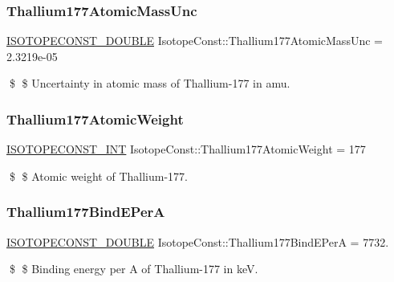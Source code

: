 \subsubsection{\texorpdfstring{Thallium177\+Atomic\+Mass\+Unc}{Thallium177AtomicMassUnc}}
{\footnotesize\ttfamily \mbox{\hyperlink{group___isotope_const-_macros_ga8f45a7272ce02c0b4c65c44636ed719a}{I\+S\+O\+T\+O\+P\+E\+C\+O\+N\+S\+T\+\_\+\+D\+O\+U\+B\+LE}} Isotope\+Const\+::\+Thallium177\+Atomic\+Mass\+Unc = 2.\+3219e-\/05}

\$ \$ Uncertainty in atomic mass of Thallium-\/177 in amu. \mbox{\label{group___isotope_const-_thallium-_tl177_ga06bbaae2fe662b8d554f86f44a942c0a}} 
\subsubsection{\texorpdfstring{Thallium177\+Atomic\+Weight}{Thallium177AtomicWeight}}
{\footnotesize\ttfamily \mbox{\hyperlink{group___isotope_const-_macros_ga5f18360b3e99483a35c32d789e62621c}{I\+S\+O\+T\+O\+P\+E\+C\+O\+N\+S\+T\+\_\+\+I\+NT}} Isotope\+Const\+::\+Thallium177\+Atomic\+Weight = 177}

\$ \$ Atomic weight of Thallium-\/177. \mbox{\label{group___isotope_const-_thallium-_tl177_gaf2d043d7023af0c344ac5c48c51ccb45}} 
\subsubsection{\texorpdfstring{Thallium177\+Bind\+E\+PerA}{Thallium177BindEPerA}}
{\footnotesize\ttfamily \mbox{\hyperlink{group___isotope_const-_macros_ga8f45a7272ce02c0b4c65c44636ed719a}{I\+S\+O\+T\+O\+P\+E\+C\+O\+N\+S\+T\+\_\+\+D\+O\+U\+B\+LE}} Isotope\+Const\+::\+Thallium177\+Bind\+E\+PerA = 7732.}

\$ \$ Binding energy per A of Thallium-\/177 in keV. \mbox{\label{group___isotope_const-_thallium-_tl177_gaca9962061409f6d5eb96abf497ecead4}} 
